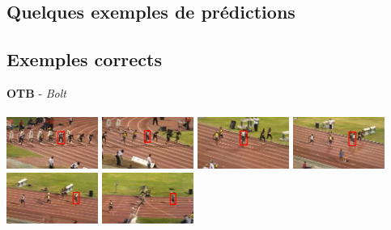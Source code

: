 \documentclass[10pt,twocolumn,letterpaper,french]{article}
\begin{document}
\begin{appendices}

  \section{Quelques exemples de prédictions}
  \label{annexe_exemples}
  \subsection*{Exemples corrects}
  \begin{center}

    \hspace{1cm}

  \textbf{OTB} - \textit{Bolt}\\
  \hspace{1cm}\\
  \includegraphics[width=85pt]{images/exemples/ok/bolt/000001.png}
  \includegraphics[width=85pt]{images/exemples/ok/bolt/000038.png}
  \includegraphics[width=85pt]{images/exemples/ok/bolt/000117.png}
  \includegraphics[width=85pt]{images/exemples/ok/bolt/000169.png}
  \includegraphics[width=85pt]{images/exemples/ok/bolt/000231.png}
  \includegraphics[width=85pt]{images/exemples/ok/bolt/000281.png}\\
  \hspace{1cm}\\
  \hspace{1cm}\\


\end{center}
\end{appendices}
\end{document}
